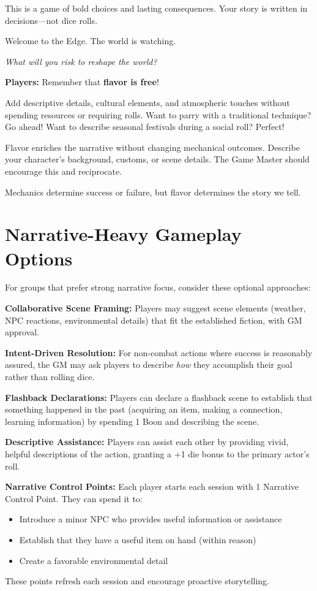 This is a game of bold choices and lasting consequences. Your story is written in decisions—not dice rolls.

Welcome to the Edge. The world is watching.

\begin{center} 
\emph{What will you risk to reshape the world?} 
\end{center}

\begin{tcolorbox}[colback=gray!5!white, colframe=gray!75!black, title=Flavor is Free, fonttitle=\bfseries] \textbf{Players:} Remember that \textbf{flavor is free}!

Add descriptive details, cultural elements, and atmospheric touches without spending resources or requiring rolls. Want to parry with a traditional technique? Go ahead! Want to describe seasonal festivals during a social roll? Perfect!

Flavor enriches the narrative without changing mechanical outcomes. Describe your character's background, customs, or scene details. The Game Master should encourage this and reciprocate.

Mechanics determine success or failure, but flavor determines the story we tell.\end{tcolorbox}

\section*{Narrative-Heavy Gameplay Options}

For groups that prefer strong narrative focus, consider these optional approaches:

\textbf{Collaborative Scene Framing:} Players may suggest scene elements (weather, NPC reactions, environmental details) that fit the established fiction, with GM approval.

\textbf{Intent-Driven Resolution:} For non-combat actions where success is reasonably assured, the GM may ask players to describe \emph{how} they accomplish their goal rather than rolling dice.

\textbf{Flashback Declarations:} Players can declare a flashback scene to establish that something happened in the past (acquiring an item, making a connection, learning information) by spending 1 Boon and describing the scene.

\textbf{Descriptive Assistance:} Players can assist each other by providing vivid, helpful descriptions of the action, granting a +1 die bonus to the primary actor's roll.

\textbf{Narrative Control Points:} Each player starts each session with 1 Narrative Control Point. They can spend it to:
\begin{itemize}
\item Introduce a minor NPC who provides useful information or assistance
\item Establish that they have a useful item on hand (within reason)
\item Create a favorable environmental detail
\end{itemize}

These points refresh each session and encourage proactive storytelling.